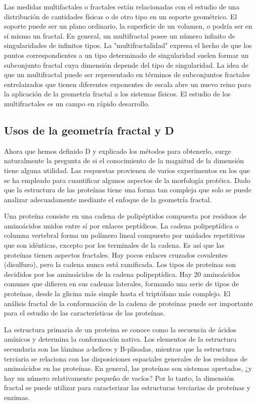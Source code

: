\documentclass[11pt]{article}
\begin{document}
Las medidas multifactales o fractales están relacionadas con el estudio de una distribución de cantidades físicas o de otro tipo en un soporte geométrico. El soporte puede ser un plano ordinario, la superficie de un volumen, o podría ser en sí mismo un fractal. En general, un multifractal posee un número infinito de singularidades de infinitos tipos. La "multifractalidad" expresa el hecho de que los puntos correspondientes a un tipo determinado de singularidad suelen formar un subconjunto fractal cuya dimensión depende del tipo de singularidad. La idea de que un multifractal puede ser representado en términos de subconjuntos fractales entrelaizados que tienen diferentes exponentes de escala abre un nuevo reino para la aplicación de la geometría fractal a los sistemas físicos. El estudio de los multifractales es un campo en rápido desarrollo.


\subsection{Usos de la geometría fractal y D}

Ahora que hemos definido D y explicado los métodos para obtenerlo, surge naturalmente la pregunta de si el conocimiento de la magnitud de la dimensión tiene alguna utilidad. Las respuestas provienen de varios experimentos en los que se ha empleado para cuantificar algunos aspectos de la morfología protéica. Dado que la estructura de las proteínas tiene una forma tan compleja que solo se puede analizar adecuadamente mediante el enfoque de la geometría fractal. 

Una proteína consiste en una cadena de polipéptidos compuesta por residuos de aminoácidos unidos entre sí por enlaces peptídicos. La cadena polipeptídica o columna vertebral forma un polímero lineal compuesto por unidades repetitivas que son idénticas, excepto por los terminales de la cadena. Es así que las proteínas tienen aspectos fractales. Hay pocos enlaces cruzados covalentes (disulfuro), pero la cadena nunca está ramificada. Los tipos de proteínas son decididos por los aminoácidos de la cadena polipeptídica. Hay 20 aminoácidos comunes que difieren en sus cadenas laterales, formando una serie de tipos de proteínas, desde la glicina más simple hasta el triptófano más complejo. El análisis fractal de la conformación de la cadena de proteínas puede ser importante para el estudio de las características de las proteínas.

La estructura primaria de un proteina se conoce como la secuencia de ácidos amínicos y determina la conformación nativa. Los elementos de la estructura secundaria son las láminas a-helices y B-plisadas, mientras que la estructura terciaria se relaciona con las disposiciones espaciales generales de los residuos de aminoácidos en las proteínas. En general, las proteínas son sistemas apretados, ¿y hay un número relativamente pequeño de vacíos? Por lo tanto, la dimensión fractal se puede utilizar para caracterizar las estructuras terciarias de proteínas y enzimas.
\end{document}

